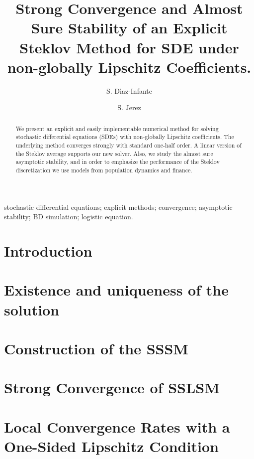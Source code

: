 \documentclass[1p,sort&compress]{elsarticle}
\begin{document}
	\begin{frontmatter}
		\title{
			Strong Convergence and Almost Sure Stability of an Explicit Steklov Method
			for SDE under non-globally Lipschitz Coefficients.
		}%
		\author[sj]{S. D\'{\i}az-Infante}
		\author[sj]{S. Jerez}
		\address[sj]{Split Step Linear Steklov Method 
		Department of Applied Mathematics, CIMAT, Guanajuato, Gto., Mexico,
		36240.
		}
		\begin{abstract}
			We present an explicit and easily implementable numerical method for
			solving stochastic differential equations (SDEs) with non-globally Lipschitz
			coefficients. The underlying method converges strongly with standard 
			one-half order. A linear version of the Steklov average supports our new solver. Also, we study
			the almost sure asymptotic stability, and in  order to emphasize the 
			performance of the Steklov discretization we use models from population dynamics 
			and finance.
		\end{abstract}
		\begin{keyword}
			stochastic differential equations;
			explicit methods; convergence; asymptotic stability;
			BD simulation; logistic equation.
		\end{keyword}
	\end{frontmatter}
	\section{Introduction}
		
	\section{Existence and uniqueness of the solution}
		
	\section{Construction of the SSSM}
		
	\section{Strong Convergence of SSLSM}
		
		
	\section{Local Convergence Rates with a One-Sided Lipschitz Condition}
		
\end{document}
